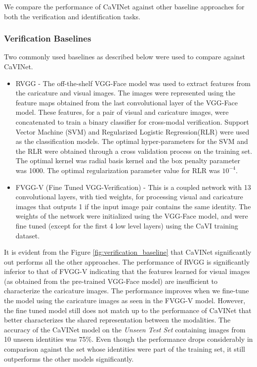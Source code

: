 We compare the performance of CaVINet against other baseline approaches for both the verification and identification tasks.

\subsubsection{Verification Baselines}
Two commonly used baselines as described below were used to compare against CaVINet.
\begin{itemize}
  \item RVGG - The off-the-shelf VGG-Face model was used to extract features from the caricature and visual images. The images were represented using the feature maps obtained from the last convolutional layer of the VGG-Face model. These features, for a pair of visual and caricature images, were concatenated to train a binary classifier for cross-modal verification. Support Vector Machine (SVM) \cite{svm} and Regularized Logistic Regression(RLR) were used as the classification models. The optimal hyper-parameters for the SVM and the RLR were obtained through a cross validation process on the training set. The optimal kernel was radial basis kernel and the box penalty parameter was 1000. The optimal regularization parameter value for RLR was $10^{-4}$.

\item FVGG-V (Fine Tuned VGG-Verification) - This is a coupled network with 13 convolutional layers, with tied weights, for processing visual and caricature images that outputs 1 if the input image pair contains the same identity. The weights of the network were initialized using the VGG-Face model, and were fine tuned (except for the first 4 low level layers) using the CaVI training dataset.

\end{itemize}
It is evident from the Figure \ref{fig:verification_baseline} that CaVINet significantly out performs all the other approaches. The performance of RVGG is significantly inferior to that of FVGG-V indicating that the features learned for visual images (as obtained from the pre-trained VGG-Face model) are insufficient to characterize the caricature images. The performance improves when we fine-tune the model using the caricature images as seen in the FVGG-V model. However, the fine tuned model still does not match up to the performance of CaVINet that better characterizes the shared representation between the modalities. The accuracy of the CaVINet model on the \emph{Unseen Test Set} containing images from 10 unseen identities was 75\%. Even though the performance drops considerably in comparison against the set whose identities were part of the training set, it still outperforms the other models significantly. 

